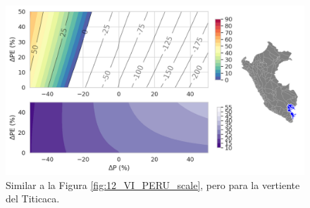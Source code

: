 \begin{figure}[ht!]
	\includegraphics[scale=.75]{Images/12_VI_Nivel_scale_Titicaca.png}
	\centering
	\caption{Similar a la Figura \ref{fig:12_VI_PERU_scale}, pero para la vertiente del Titicaca.}
	\label{fig:12_VI_Nivel_scale_Titicaca}
\end{figure}

